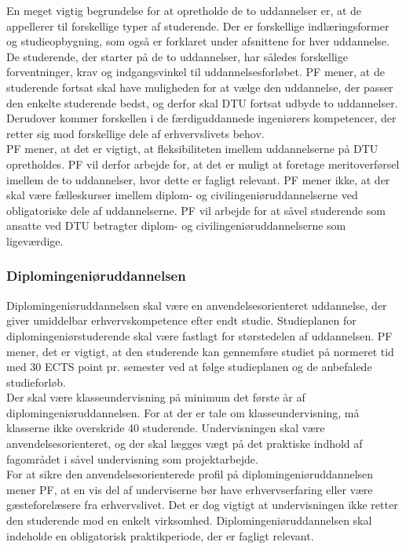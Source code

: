 En meget vigtig begrundelse for at opretholde de to uddannelser er, at de appellerer til forskellige typer af studerende. Der er forskellige indlæringsformer og studieopbygning, som også er forklaret under afsnittene for hver uddannelse. De studerende, der starter på de to uddannelser, har således forskellige forventninger, krav og indgangsvinkel til uddannelsesforløbet. PF mener, at de studerende fortsat skal have muligheden for at vælge den uddannelse, der passer den enkelte studerende bedst, og derfor skal DTU fortsat udbyde to uddannelser. Derudover kommer forskellen i de færdiguddannede ingeniørers kompetencer, der retter sig mod forskellige dele af erhvervslivets behov.\\

PF mener, at det er vigtigt, at fleksibiliteten imellem uddannelserne på DTU opretholdes. PF vil derfor arbejde for, at
det er muligt at foretage meritoverførsel imellem de to uddannelser, hvor dette er fagligt relevant. PF mener ikke, at der skal være fælleskurser imellem diplom- og civilingeniøruddannelserne ved obligatoriske dele af uddannelserne. PF vil arbejde for at såvel studerende som ansatte ved DTU betragter diplom- og civilingeniøruddannelserne som ligeværdige.

\subsubsection{Diplomingeniøruddannelsen}
Diplomingeniøruddannelsen skal være en anvendelsesorienteret uddannelse, der giver umiddelbar erhvervskompetence efter endt studie. Studieplanen for diplomingeniørstuderende skal være fastlagt for størstedelen af uddannelsen. PF mener, det er vigtigt, at den studerende kan gennemføre studiet på normeret tid med 30 ECTS point pr. semester ved at følge studieplanen og de anbefalede studieforløb.\\

Der skal være klasseundervisning på minimum det første år af diplomingeniøruddannelsen. For at der er tale om klasseundervisning, må klasserne ikke overskride 40 studerende. Undervisningen skal være anvendelsesorienteret, og der skal lægges vægt på det praktiske indhold af fagområdet i såvel undervisning som projektarbejde.\\

For at sikre den anvendelsesorienterede profil på diplomingeniøruddannelsen mener PF, at en vis del af underviserne bør have erhvervserfaring eller være gæsteforelæsere fra erhvervslivet. Det er dog vigtigt at undervisningen ikke retter den studerende mod en enkelt virksomhed. Diplomingeniøruddannelsen skal indeholde en obligatorisk praktikperiode, der er fagligt relevant.

